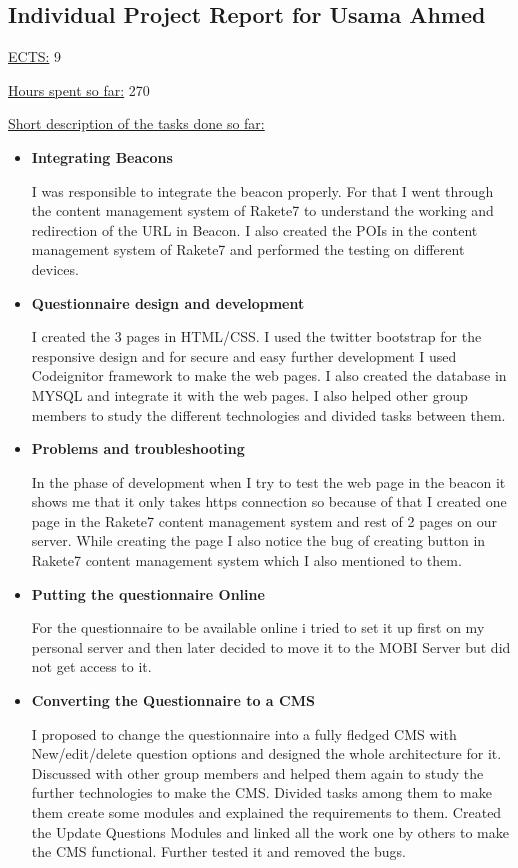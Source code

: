 \subsection{Individual Project Report for Usama Ahmed}
\par \underline{ECTS:} 9
\par \underline{Hours spent so far:} 270
\par \underline{Short description of the tasks done so far:}
\begin{itemize}
	\item \textbf{Integrating Beacons}
	\par I was responsible to integrate the beacon properly. For that I went through the content management system of Rakete7 to understand the working and redirection of the URL in Beacon. I also created the POIs in the content management system of Rakete7 and performed the testing on different devices.  
	\item \textbf{Questionnaire design and development}
	\par I created the 3 pages in HTML/CSS. I used the twitter bootstrap for the responsive design and for secure and easy further development I used Codeignitor framework to make the web pages. I also created the database in MYSQL and integrate it with the web pages. I also helped other group members to study the different technologies and divided tasks between them.
	\item \textbf{Problems and troubleshooting}
	\par In the phase of development when I try to test the web page in the beacon it shows me that it only takes https connection so because of that I created one page in the Rakete7 content management system and rest of 2 pages on our server.  While creating the page I also notice the bug of creating button in Rakete7 content management system which I also mentioned to them.
	\item \textbf{Putting the questionnaire Online}
	\par For the questionnaire to be available online i tried to set it up first on my personal server and then later decided to move it to the MOBI Server but did not get access to it.
	\item \textbf{ Converting the Questionnaire to a CMS}
	\par I proposed to change the questionnaire into a fully fledged CMS with New/edit/delete question options and designed the whole architecture for it. Discussed with other group members and helped them again to study the further technologies to make the CMS. Divided tasks among them to make them create some modules and explained the requirements to them. Created the Update Questions Modules and linked all the work one by others to make the CMS functional. Further tested it and removed the bugs.

\end{itemize}
